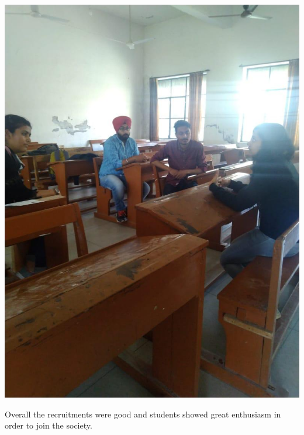 \documentclass[12pt, a4 paper]{article}
\begin{document}
\begin{center}
\begin{Large}
\begin{multicols}{2}
\end{multicols} 

\begin{multicols}{2}
\includegraphics[width=\linewidth]{image11.jpeg}

\columnbreak
Overall the recruitments were good and students showed great enthusiasm in order to join the society.
  
\end{multicols} 

\end{Large} 
\end{center}

\newpage 
\end{document}
